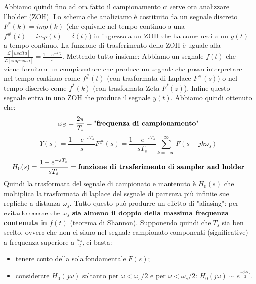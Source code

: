 \begin{landscape}
\begin{multicols*}{2}
    Abbiamo quindi fino ad ora fatto il campionamento ci serve ora analizzare l'holder (ZOH).\newline
    Lo schema che analiziamo è costituito da un segnale discreto $F^*(k) = imp(k)$ (che equivale nel tempo continuo a una $f^\#(t) = imp(t) = \delta(t)$) in ingresso a un ZOH che ha come uscita un $y(t)$ a tempo continuo.\newline
    \newline
    La funzione di trasferimento dello ZOH è uguale alla $\frac{\mathcal{L}[uscita]}{\mathcal{L}[ingresso]} = \frac{1-e^{-sT_s}}{s}$.\newline
    \newline
    Mettendo tutto insieme:\newline
    Abbiamo un segnale $f(t)$ che viene fornito a un campionatore che produce un segnale che posso interpretare nel tempo continuo come $f^\#(t)$ (con trasformata di Laplace $F^\#(s)$) o nel tempo discreto come $f^*(k)$ (con trasformata Zeta $F^*(z)$). Infine questo segnale entra in uno ZOH che produce il segnale $y(t)$.\newline
    \newline
    Abbiamo quindi ottenuto che:
    \[
        \omega_S =\frac{2\pi}{T_s} = \text{"\textbf{frequenza di campionamento}"}
    \]
        \[Y(s) = \frac{1-e^{-sT_s}}{s} F^\#(s) = \frac{1- e^{-sT_s}}{sT_s} \sum_{k=-\infty}^{\infty} F(s-j k \omega_s)
    \]
    \[
        H_0(s) = \frac{1- e^{-sT_s}}{sT_s} = \text{\textbf{funzione di trasferimento di sampler and holder}}
    \]
    Quindi la trasformata del segnale di campionato e mantenuto è $H_0(s)$ che moltiplica la trasformata di laplace del segnale di partenza più infinite sue repliche a distanza $\omega_s$.\newline
    Tutto questo può produrre un effetto di "aliasing": per evitarlo occore che $\omega_s$ \textbf{sia almeno il doppio della massima frequenza contenuta in} $f(t)$ (teorema di Shannon). Supponendo quindi che $T_s$ sia ben scelto, ovvero che non ci siano nel segnale campionato componenti (significative) a frequenza superiore a $\frac{\omega_s}{2}$, ci basta:
    \begin{itemize}
        \item tenere conto della sola fondamentale  $F(s)$;
        \item considerare $H_0(j \omega)$ soltanto per $\omega< \omega_s/2$ e per $\omega< \omega_s /2$: $H_0(j \omega) \sim  e^{\frac{-j \omega T_s}{2}}$.
    \end{itemize}
    \ \newline

\end{multicols*}
\end{landscape}
